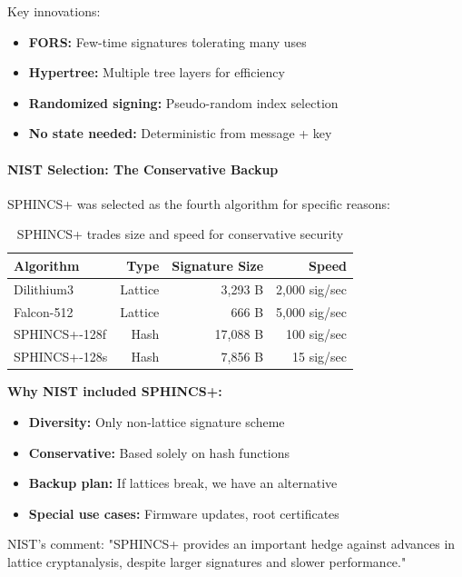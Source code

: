 \documentclass[11pt,a4paper]{article}
\begin{document}
Key innovations:
\begin{itemize}
    \item \textbf{FORS:} Few-time signatures tolerating many uses
    \item \textbf{Hypertree:} Multiple tree layers for efficiency
    \item \textbf{Randomized signing:} Pseudo-random index selection
    \item \textbf{No state needed:} Deterministic from message + key
\end{itemize}

\paragraph{NIST Selection: The Conservative Backup}

SPHINCS+ was selected as the fourth algorithm for specific reasons:

\begin{table}[h]
\centering
\begin{tabular}{|l|r|r|r|}
\hline
\textbf{Algorithm} & \textbf{Type} & \textbf{Signature Size} & \textbf{Speed} \\
\hline
Dilithium3 & Lattice & 3,293 B & 2,000 sig/sec \\
Falcon-512 & Lattice & 666 B & 5,000 sig/sec \\
SPHINCS+-128f & Hash & 17,088 B & 100 sig/sec \\
SPHINCS+-128s & Hash & 7,856 B & 15 sig/sec \\
\hline
\end{tabular}
\caption{SPHINCS+ trades size and speed for conservative security}
\end{table}

\textbf{Why NIST included SPHINCS+:}
\begin{itemize}
    \item \textbf{Diversity:} Only non-lattice signature scheme
    \item \textbf{Conservative:} Based solely on hash functions
    \item \textbf{Backup plan:} If lattices break, we have an alternative
    \item \textbf{Special use cases:} Firmware updates, root certificates
\end{itemize}

NIST's comment: "SPHINCS+ provides an important hedge against advances in lattice cryptanalysis, despite larger signatures and slower performance."
\end{document}
